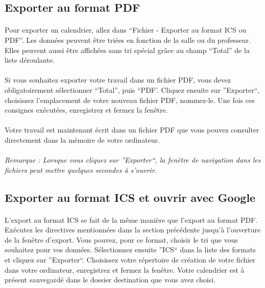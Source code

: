 \documentclass[a4paper,10pt]{report}
\begin{document}
      \subsection{Exporter au format PDF}
      
	\paragraph{}
	  Pour exporter un calendrier, allez dans ``Fichier - Exporter au format ICS ou PDF''.
	  Les données peuvent être triées en fonction de la salle ou du professeur.
	  Elles peuvent aussi être affichées sans tri spécial grâce au champ ``Total'' de la liste déroulante.
	  
	\paragraph{}
	  Si vous souhaitez exporter votre travail dans un fichier PDF, vous devez obligatoirement sélectionner ``Total'', puis ``PDF'.
	  Cliquez ensuite sur ''Exporter``, choisissez l'emplacement de votre nouveau fichier PDF, nommez-le.
	  Une fois ces consignes exécutées, enregistrez et fermez la fenêtre.
	
	\paragraph{}
	  Votre travail est maintenant écrit dans un fichier PDF que vous pouvez consulter directement dans la mémoire de votre ordinateur.

	\paragraph{}
	  \textit{Remarque : Lorsque vous cliquez sur ''Exporter``, la fenêtre de navigation dans les fichiers peut mettre quelques secondes à s'ouvrir.}
	
      \subsection{Exporter au format ICS et ouvrir avec Google}
	  
	\paragraph{}
	  L'export au format ICS se fait de la même manière que l'export au format PDF.
	  Exécutez les directives mentionnées dans la section précédente jusqu'à l'ouverture de la fenêtre d'export.
	  Vous pouvez, pour ce format, choisir le tri que vous souhaitez pour vos données.
	  Sélectionnez ensuite ''ICS`` dans la liste des formats et cliquez sur ''Exporter``.
	  Choisissez votre répertoire de création de votre fichier dans votre ordinateur, enregistrez  et fermez la fenêtre.
	  Votre calendrier est à présent sauvegardé dans le dossier destination que vous avez choisi.
	  
\end{document}
